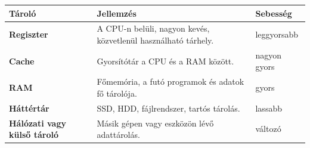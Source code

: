 \begin{tabularx}{\textwidth}{>{\bfseries}lXl}
Tároló & Jellemzés & Sebesség \\
\midrule
Regiszter & A CPU-n belüli, nagyon kevés, közvetlenül használható tárhely. & leggyorsabb \\
Cache & Gyorsítótár a CPU és a RAM között. & nagyon gyors \\
RAM & Főmemória, a futó programok és adatok fő tárolója. & gyors \\
Háttértár & SSD, HDD, fájlrendszer, tartós tárolás. & lassabb \\
Hálózati vagy külső tároló & Másik gépen vagy eszközön lévő adattárolás. & változó \\
\end{tabularx}
